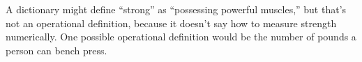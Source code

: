 A dictionary might define ``strong'' as ``possessing powerful muscles,''
but that's not an operational definition, because
it doesn't say how to measure strength numerically. 
 One possible operational definition would be the number of
pounds a person can bench press.



